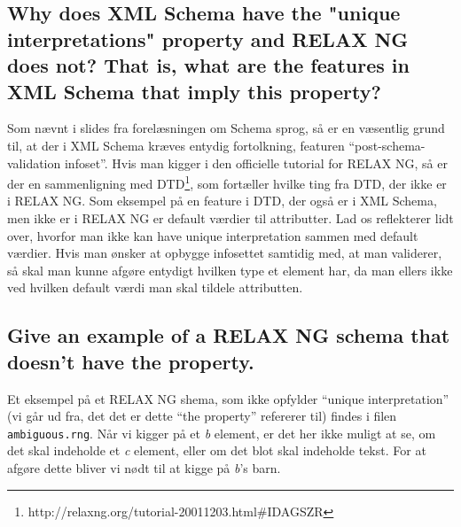 \documentclass[a4paper,10pt]{article}
\begin{document}
\subsection*{Why does XML Schema have the "unique interpretations" property and RELAX NG does not? That is, what are the features in XML Schema that imply this property?} 
Som nævnt i slides fra forelæsningen om Schema sprog, så er en væsentlig grund til, at der i XML Schema kræves entydig fortolkning, featuren ``post-schema-validation infoset''. Hvis man kigger i den officielle tutorial for RELAX NG, så er der en sammenligning med DTD\footnote{http://relaxng.org/tutorial-20011203.html\#IDAGSZR}, som fortæller hvilke ting fra DTD, der ikke er i RELAX NG. Som eksempel på en feature i DTD, der også er i XML Schema, men ikke er i RELAX NG er default værdier til attributter. Lad os reflekterer lidt over, hvorfor  man ikke kan have unique interpretation sammen med default værdier. Hvis man ønsker at opbygge infosettet samtidig med, at man validerer, så skal man kunne afgøre entydigt hvilken type et element har, da man ellers ikke ved hvilken default værdi man skal tildele attributten.

\subsection*{Give an example of a RELAX NG schema that doesn't have the property.}
Et eksempel på et RELAX NG shema, som ikke opfylder ``unique interpretation'' (vi går ud fra, det det er dette ``the property'' refererer til) findes i filen \texttt{ambiguous.rng}. Når vi kigger på et \emph{b} element, er det her ikke muligt at se, om det skal indeholde et \emph{c} element, eller om det blot skal indeholde tekst. For at afgøre dette bliver vi nødt til at kigge på \emph{b}'s barn.
\end{document}
